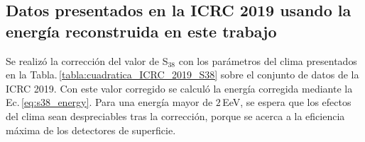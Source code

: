 

\subsection{Datos presentados en la ICRC 2019 usando la energía reconstruida en este trabajo}

Se realizó la corrección del valor de S$_{38}$ con los parámetros del clima presentados en la Tabla.\,\ref{tabla:cuadratica_ICRC_2019_S38} sobre el conjunto de datos de la ICRC 2019. Con este valor corregido se calculó la energía corregida mediante la Ec.\,\ref{eq:s38_energy}. Para una energía mayor de $2\,$EeV, se espera que los efectos del clima sean despreciables tras la corrección, porque se acerca a la eficiencia máxima de los detectores de superficie. %

